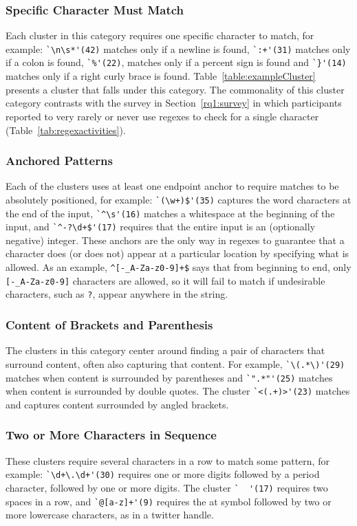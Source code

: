 \subsubsection{Specific Character Must Match}
\label{cluster:single}
Each cluster in this category requires one specific character to match, for example:
\verb!`\n\s*'(42)! matches only if a newline is found, \verb!`:+'(31)! matches only if a colon is found, \verb!`%'(22)!, matches only if a percent sign is found and \verb!`}'(14)! matches only if a right curly brace is found.
Table~\ref{table:exampleCluster} presents a cluster that falls under this category.
The commonality of this cluster category contrasts with the survey in Section~\ref{rq1:survey} in which participants reported to very rarely or never use regexes to check for a single character (Table~\ref{tab:regexactivities}).

\subsubsection{Anchored Patterns}
Each of the clusters uses at least one endpoint anchor to require matches to be absolutely positioned, for example:
\verb!`(\w+)$'(35)! captures the word characters at the end of the input, \verb!`^\s'(16)! matches a whitespace at the beginning of the input, and \verb!`^-?\d+$'(17)! requires that the entire input is an (optionally negative) integer.
These anchors are the only way in regexes to guarantee that a character does (or does not) appear at a particular location by specifying what is allowed. As an example, \verb!^[-_A-Za-z0-9]+$! says that from beginning to end, only \verb![-_A-Za-z0-9]! characters are allowed, so it will fail to match if undesirable characters, such as \verb!?!, appear anywhere in the string.

\subsubsection{Content of Brackets and Parenthesis}
\label{cluster:contentparens}
The clusters in this category center around finding a pair of characters that surround content, often also capturing that content. For example,
\verb!`\(.*\)'(29)! matches when content is surrounded by parentheses and \verb!`".*"'(25)! matches  when content is surrounded by double quotes.  The cluster \verb!`<(.+)>'(23)! matches and captures content surrounded by angled brackets.

\subsubsection{Two or More Characters in Sequence}
\label{cluster:multiple}
These clusters require several characters in a row to match some pattern, for example:
\verb!`\d+\.\d+'(30)! requires one or more digits followed by a period character, followed by one or more digits.  The cluster \verb!`  '(17)! requires two spaces in a row, and \verb!`@[a-z]+'(9)! requires the at symbol followed by two or more lowercase characters, as in a twitter handle.

